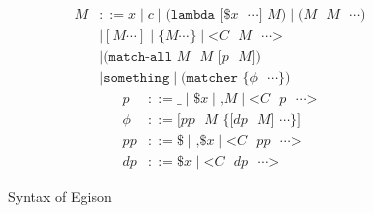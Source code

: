 \documentclass[9pt, a4paper]{extarticle}
\begin{document}
\begin{figure}[!t]
    \begin{multicols}{2}
        \noindent
        \begin{align*}
            M &::= x \mid c \mid \texttt{(lambda [\$$x$ $\cdots$] $M$)} \mid \texttt{($M$ $M$ $\cdots$)} \\
            &\mid [M \cdots] \mid \{M \cdots\} \mid \texttt{<$C$ $M$ $\cdots$>} \\
            &\mid \texttt{(match-all $M$ $M$ [$p$ $M$])} \\
            &\mid \texttt{something} \mid \texttt{(matcher \{$\phi$ $\cdots$\})}
        \end{align*}
        \columnbreak
        \begin{align*}
            p &::= \texttt{_} \mid \texttt{\$$x$} \mid \texttt{,$M$} \mid \texttt{<$C$ $p$ $\cdots$>} \\
            \phi &::= \texttt{[$pp$ $M$ \{[$dp$ $M$] $\cdots$\}]} \\
            pp &::= \texttt{\$} \mid \texttt{,\$$x$} \mid \texttt{<$C$ $pp$ $\cdots$>} \\
            dp &::= \texttt{\$$x$} \mid \texttt{<$C$ $dp$ $\cdots$>}
        \end{align*}
    \end{multicols}
    \caption{Syntax of Egison}
    \label{fig:syntax}
\end{figure}
\end{document}
